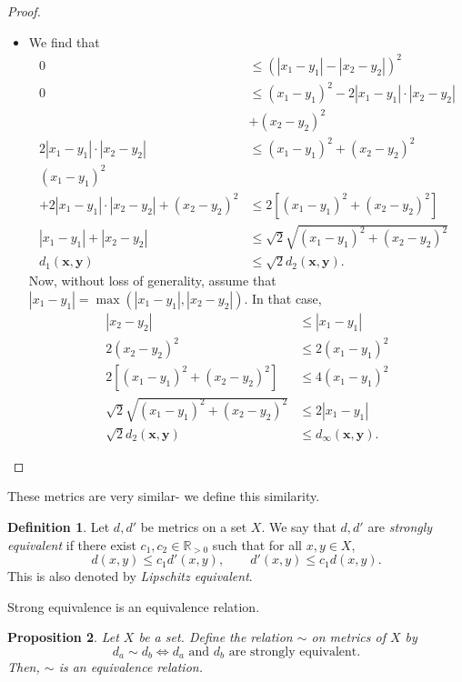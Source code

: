 \documentclass[a4paper, openany]{memoir}
\theoremstyle{definition}
\newtheorem{definition}{Definition}[section]
\theoremstyle{plain}
\newtheorem{proposition}[definition]{Proposition}
\begin{document}
\begin{proof}
\begin{itemize}
    \item We find that
    \begin{align*}
        0 &\leqslant (|x_1 - y_1| - |x_2 - y_2|)^2 \\
        0 &\leqslant (x_1 - y_1)^2 - 2|x_1 - y_1| \cdot |x_2 - y_2| \\
        &+ (x_2 - y_2)^2 \\
        2|x_1 - y_1| \cdot |x_2 - y_2| &\leqslant (x_1 - y_1)^2 + (x_2 - y_2)^2 \\
        (x_1 - y_1)^2 & \\
        + 2|x_1 - y_1| \cdot |x_2 - y_2| + (x_2 - y_2)^2 &\leqslant 2 [(x_1 - y_1)^2 + (x_2 - y_2)^2] \\
        |x_1 - y_1| + |x_2 - y_2| &\leqslant \sqrt{2} \sqrt{(x_1 - y_1)^2 + (x_2 - y_2)^2} \\
        d_1(\bm{x}, \bm{y}) &\leqslant \sqrt{2} d_2(\bm{x}, \bm{y}). 
    \end{align*}
    Now, without loss of generality, assume that $|x_1 - y_1| = \max(|x_1 - y_1|, |x_2 - y_2|)$. In that case, 
    \begin{align*}
        |x_2 - y_2| &\leqslant |x_1 - y_1| \\
        2(x_2 - y_2)^2 &\leqslant 2(x_1 - y_1)^2 \\
        2[(x_1 - y_1)^2 + (x_2 - y_2)^2] &\leqslant 4(x_1 - y_1)^2 \\
        \sqrt{2} \sqrt{(x_1 - y_1)^2 + (x_2 - y_2)^2} &\leqslant 2|x_1 - y_1| \\
        \sqrt{2} d_2(\bm{x}, \bm{y}) &\leqslant d_\infty(\bm{x}, \bm{y}).
    \end{align*}
\end{itemize}
\end{proof}
\noindent These metrics are very similar- we define this similarity.
\begin{definition}
Let $d, d'$ be metrics on a set $X$. We say that $d, d'$ are \emph{strongly equivalent} if there exist $c_1, c_2 \in \mathbb{R}_{> 0}$ such that for all $x, y \in X$,
\[d(x, y) \leqslant c_1 d'(x, y) , \qquad d'(x, y) \leqslant c_1 d(x, y).\]
This is also denoted by \emph{Lipschitz equivalent}.
\end{definition}
\noindent Strong equivalence is an equivalence relation. 
\begin{proposition}
Let $X$ be a set. Define the relation $\sim$ on metrics of $X$ by
\[d_a \sim d_b \iff d_a \text{ and } d_b \text{ are strongly equivalent}.\]
Then, $\sim$ is an equivalence relation.
\end{proposition}
\end{document}
